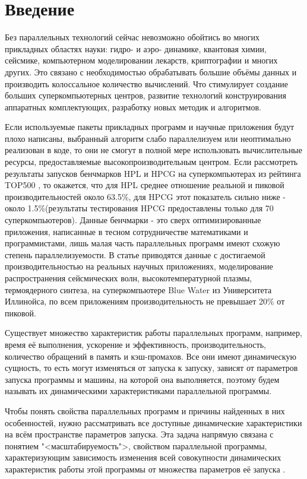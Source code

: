 \section{Введение}
	Без параллельных технологий сейчас невозможно обойтись во многих прикладных областях науки: гидро- и аэро- динамике, квантовая химии, сейсмике, компьютерном моделировании лекарств, криптографии и многих других. Это связано с необходимостью обрабатывать большие объёмы данных и производить колоссальное количество вычислений. Что стимулирует создание больших суперкомпьютерных центров, развитие технологий конструирования аппаратных комплектующих, разработку новых методик и алгоритмов.

	Если используемые пакеты прикладных программ и научные приложения будут плохо написаны, выбранный алгоритм слабо параллелизуем или неоптимально реализован в коде, то они не смогут в полной мере использовать вычислительные ресурсы, предоставляемые высокопроизводительным центром. Если рассмотреть результаты запусков бенчмарков HPL и HPCG на суперкомпьютерах из рейтинга TOP500 \cite{top500}, то окажется, что для HPL среднее отношение реальной и пиковой производительностей около 63.5\%, для HPCG этот показатель сильно ниже - около 1.5\%(результаты тестирования HPCG предоставлены только для 70 суперкомпьютеров). Данные бенчмарки - это сверх оптимизированные приложения, написанные в тесном сотрудничестве математиками и программистами, лишь малая часть параллельных программ имеют схожую степень параллелизуемости. В статье \cite{Perf_low} приводятся данные с достигаемой производительностью на реальных научных приложениях, моделирование распространения сейсмических волн, высокотемпературной плазмы, термоядерного синтеза, на суперкомпьютере Blue Water из Университета Иллинойса, по всем приложениям производительность не превышает 20\% от пиковой.

	Существует множество характеристик работы параллельных программ, например, время её выполнения, ускорение и эффективность, производительность, количество обращений в память и кэш-промахов. Все они имеют динамическую сущность, то есть могут изменяться от запуска к запуску, зависят от параметров запуска программы и машины, на которой она выполняется, поэтому будем называть их динамическими характеристиками параллельной программы.

	Чтобы понять свойства параллельных программ и причины найденных в них особенностей, нужно рассматривать все доступные динамические характеристики на всём пространстве параметров запуска. Эта задача напрямую связана с понятием "<масштабируемость">, свойством параллельной программы, характеризующим зависимость изменения всей совокупности динамических характеристик работы этой программы от множества параметров её запуска \cite{scalability_def}.


